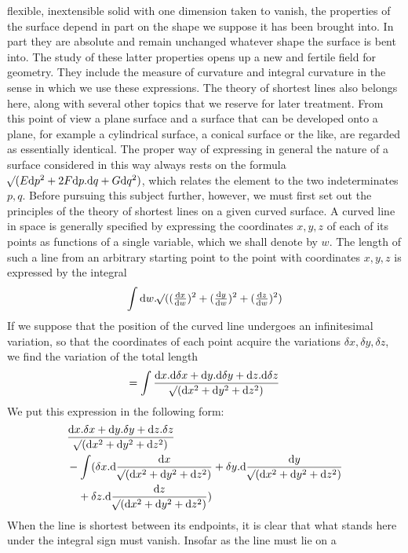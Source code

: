 %
flexible, inextensible solid with one dimension taken to vanish, the properties of the surface depend in part on the shape we suppose it has been brought into. In part they are absolute and remain unchanged whatever shape the surface is bent into. The study of these latter properties opens up a new and fertile field for geometry. They include the measure of curvature and integral curvature in the sense in which we use these expressions. The theory of shortest lines also belongs here, along with several other topics that we reserve for later treatment. From this point of view a plane surface and a surface that can be developed onto a plane, for example a cylindrical surface, a conical surface or the like, are regarded as essentially identical. The proper way of expressing in general the nature of a surface considered in this way always rests on the formula \(\mathord{{}^{}\!\surd}(E\mathrm{d}p^2+2F\mathrm{d}p\mathord{.}\mathrm{d}q+G\mathrm{d}q^2)\), which relates the element to the two indeterminates \(p,q\). Before pursuing this subject further, however, we must first set out the principles of the theory of shortest lines on a given curved surface.
A curved line in space is generally specified by expressing the coordinates \(x,y,z\) of each of its points as functions of a single variable, which we shall denote by \(w\). The length of such a line from an arbitrary starting point to the point with coordinates \(x,y,z\) is expressed by the integral
\[
\int\mathrm{d}w\mathord{.}\mathord{{}^{}\!\surd}((\tfrac{\mathrm{d}x}{\mathrm{d}w})^2+(\tfrac{\mathrm{d}y}{\mathrm{d}w})^2+(\tfrac{\mathrm{d}z}{\mathrm{d}w})^2)
\]
If we suppose that the position of the curved line undergoes an infinitesimal variation, so that the coordinates of each point acquire the variations \(\delta x,\delta y,\delta z\), we find the variation of the total length
\[
=\int\frac{\mathrm{d}x\mathord{.}\mathrm{d}\delta x+\mathrm{d}y\mathord{.}\mathrm{d}\delta y+\mathrm{d}z\mathord{.}\mathrm{d}\delta z}{\mathord{{}^{}\!\surd}(\mathrm{d}x^2+\mathrm{d}y^2+\mathrm{d}z^2)}
\]
We put this expression in the following form:
\[
\begin{aligned}
&\frac{\mathrm{d}x\mathord{.}\delta x+\mathrm{d}y\mathord{.}\delta y+\mathrm{d}z\mathord{.}\delta z}{\mathord{{}^{}\!\surd}(\mathrm{d}x^2+\mathrm{d}y^2+\mathrm{d}z^2)}\\
&-\int(\delta x\mathord{.}\mathrm{d}\frac{\mathrm{d}x}{\mathord{{}^{}\!\surd}(\mathrm{d}x^2+\mathrm{d}y^2+\mathrm{d}z^2)}+\delta y\mathord{.}\mathrm{d}\frac{\mathrm{d}y}{\mathord{{}^{}\!\surd}(\mathrm{d}x^2+\mathrm{d}y^2+\mathrm{d}z^2)}\\
&\quad+\delta z\mathord{.}\mathrm{d}\frac{\mathrm{d}z}{\mathord{{}^{}\!\surd}(\mathrm{d}x^2+\mathrm{d}y^2+\mathrm{d}z^2)})
\end{aligned}
\]
When the line is shortest between its endpoints, it is clear that what stands here under the integral sign must vanish. Insofar as the line must lie on a
